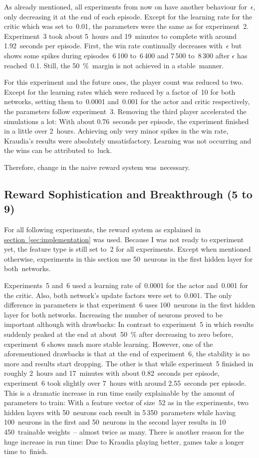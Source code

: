 \documentclass[a4paper,titlepage]{article}
\begin{document}
As already mentioned, all experiments from now on have another behaviour for~$\epsilon$, only decreasing it at the end of each episode.
Except for the learning rate for the critic which was set to~0.01, the parameters were the same as for experiment~2. Experiment~3 took about 5~hours and 19~minutes to complete with around 1.92~seconds per episode. First, the win rate continually decreases with~$\epsilon$ but shows some spikes during episodes~6\,100 to~6\,400 and 7\,500 to~8\,300 after $\epsilon$ has reached~0.1. Still, the 50~\%~margin is not achieved in a stable~manner.

For this experiment and the future ones, the player count was reduced to two. Except for the learning rates which were reduced by a factor of~10 for both networks, setting them to~0.0001 and~0.001 for the actor and critic respectively, the parameters follow experiment~3. Removing the third player accelerated the simulations a lot: With about 0.76~seconds per episode, the experiment finished in a little over 2~hours. Achieving only very minor spikes in the win rate, Kraudia's results were absolutely unsatisfactory. Learning was not occurring and the wins can be attributed to~luck. \medskip

Therefore, change in the naive reward system was~necessary.

\subsection{Reward Sophistication and Breakthrough (5 to 9)}

For all following experiments, the reward system as explained in \hyperref[sec:implementation]{section~\ref*{sec:implementation}} was used. Because I was not ready to experiment yet, the feature type is still set to~2 for all experiments. Except when mentioned otherwise, experiments in this section use 50~neurons in the first hidden layer for both~networks.

Experiments~5 and~6 used a learning rate of~0.0001 for the actor and~0.001 for the critic. Also, both network's update factors were set to~0.001. The only difference in parameters is that experiment~6 uses 100~neurons in the first hidden layer for both networks.
Increasing the number of neurons proved to be important although with drawbacks: In contrast to experiment~5 in which results suddenly peaked at the end at about~50~\% after decreasing to zero before, experiment~6 shows much more stable learning. However, one of the aforementioned drawbacks is that at the end of experiment~6, the stability is no more and results start dropping. The other is that while experiment~5 finished in roughly 2~hours and 17~minutes with about 0.82~seconds per episode, experiment~6 took slightly over 7~hours with around 2.55~seconds per episode. This is a dramatic increase in run time easily explainable by the amount of parameters to train: With a feature vector of size~52 as in the experiments, two hidden layers with 50~neurons each result in 5\,350~parameters while having 100~neurons in the first and 50~neurons in the second layer results in 10\,450~trainable weights~--  almost twice as many. There is another reason for the huge increase in run time: Due to Kraudia playing better, games take a longer time to~finish.
\end{document}

